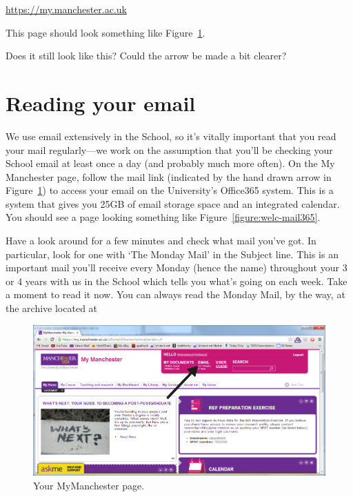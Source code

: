 \url{https://my.manchester.ac.uk}

This page should look something like Figure~\ref{figure:welc-mymanchester}.

\begin{demonote}
Does it still look like this? Could the arrow be made a bit clearer?  
\end{demonote}
\section{Reading your email}

We use email extensively in the School, so it's vitally important that
you read your mail regularly---we work on the assumption that you'll be checking your School email at least once a day (and probably much
more often). On the My Manchester page, follow the mail link (indicated by the hand drawn arrow  in
Figure~\ref{figure:welc-mymanchester}) to access your email on the
University's Office365 system. This is a system that
gives you 25GB of email storage space and an integrated calendar. You should
see a page looking something like Figure~\ref{figure:welc-mail365}.

Have a look around for a few minutes and check what mail you've
got. In particular, look for one with `The Monday Mail' in the
Subject line. This is an important mail you'll receive every Monday
(hence the name) throughout your 3 or 4 years with us in the
School which  tells you what's going on each week. Take a moment to read it now. You can always read the Monday Mail, by the way, at the archive located at\\  

\begin{figure}
\centerline{\includegraphics[width=15cm]{images/hamza-email-link2.png}}
\caption{Your MyManchester page.}
\label{figure:welc-mymanchester}
\end{figure}

